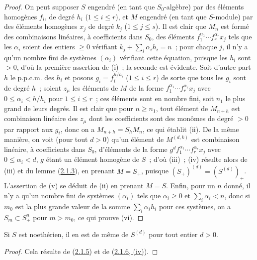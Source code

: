 \begin{proof}
On peut supposer $S$ engendré (en tant que $S_0$-algèbre) par des éléments
homogènes $f_i$, de degré $h_i$ ($1\leq i\leq r$), et $M$ engendré (en tant
que $S$-module) par des éléments homogènes $x_j$ de degré $k_j$
($1\leq j\leq s$). Il est clair que $M_n$ est formé des combinaisons
linéaires, à coefficients dans $S_0$, des éléments
$f_1^{\alpha_1}\cdots f_r^{\alpha_r}x_j$ tels que les $\alpha_i$ soient des
entiers $\geq 0$ vérifiant $k_j+\sum_i\alpha_i h_i=n$~; pour chaque $j$, il
n'y a qu'un nombre fini de systèmes $(\alpha_i)$ vérifiant cette équation,
puisque les $h_i$ sont $>0$, d'où la première assertion de (i)~; la seconde
est évidente. Soit d'autre part $h$ le p.p.c.m. des $h_i$ et posons
$g_i=f_i^{h/h_i}$ ($1\leq i\leq r$) de sorte que tous les $g_i$ sont de
degré $h$~; soient $z_\mu$ les éléments de $M$ de la forme
$f_1^{\alpha_1}\cdots f_r^{\alpha_r}x_j$ avec
$0\leq\alpha_i<h/h_i$ pour $1\leq i\leq r$~; ces éléments sont en nombre
fini, soit $n_1$ le plus grand de leurs degrés. Il est clair que pour
$n\geq n_1$, tout élément de $M_{n+h}$ est combinaison linéaire des $z_\mu$
dont les coefficients sont des monômes de degré $>0$ par rapport aux $g_i$,
donc on a $M_{n+h}=S_hM_n$, ce qui établit (ii). De la même manière, on voit
(pour tout $d>0$) qu'un élément de $M^{(d,k)}$ est combinaison linéaire, à
coefficients dans $S_0$, d'éléments de la forme
$g^df_1^{\alpha_1}\cdots f_r^{\alpha_r}x_j$ avec
$0\leq\alpha_i<d$, $g$ étant un élément homogène de $S$~; d'où (iii)~; (iv)
résulte alors de (iii) et du lemme (\hyperref[II.2.1.3-fr]{2.1.3}), en
prenant $M=S_+$, puisque $(S_+)^{(d)}=(S^{(d)})_+$. L'assertion de (v) se
déduit de (ii) en prenant $M=S$. Enfin, pour un $n$ donné, il n'y a qu'un
nombre fini de systèmes $(\alpha_i)$ tels que $\alpha_i\geq 0$ et
$\sum_i\alpha_i<n$, donc si $m_0$ est la plus grande valeur de la somme
$\sum_i\alpha_i h_i$ pour ces systèmes, on a $S_m\subset S_+^n$ pour
$m>m_0$, ce qui prouve (vi).
\end{proof}

\begin{corollary}[2.1.7]
\label{II.2.1.7-fr}
Si $S$ est noethérien, il en est de même de $S^{(d)}$ pour tout entier
$d>0$.
\end{corollary}

\begin{proof}
Cela résulte de (\hyperref[II.2.1.5-fr]{2.1.5}) et de
(\hyperref[II.2.1.6-fr]{2.1.6, (iv)}).
\end{proof}

